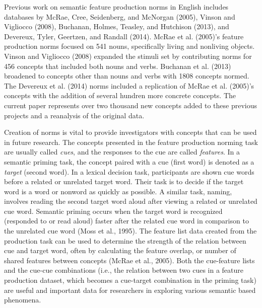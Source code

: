 \documentclass[english,,man]{apa6}
\theoremstyle{definition}
\theoremstyle{definition}
\theoremstyle{definition}
\theoremstyle{remark}
\begin{document}
Previous work on semantic feature production norms in English includes
databases by McRae, Cree, Seidenberg, and McNorgan (2005), Vinson and
Vigliocco (2008), Buchanan, Holmes, Teasley, and Hutchison (2013), and
Devereux, Tyler, Geertzen, and Randall (2014). McRae et al. (2005)'s
feature production norms focused on 541 nouns, specifically living and
nonliving objects. Vinson and Vigliocco (2008) expanded the stimuli set
by contributing norms for 456 concepts that included both nouns and
verbs. Buchanan et al. (2013) broadened to concepts other than nouns and
verbs with 1808 concepts normed. The Devereux et al. (2014) norms
included a replication of McRae et al. (2005)'s concepts with the
addition of several hundren more concrete concepts. The current paper
represents over two thousand new concepts added to these previous
projects and a reanalysis of the original data.

Creation of norms is vital to provide investigators with concepts that
can be used in future research. The concepts presented in the feature
production norming task are usually called \emph{cues}, and the
responses to the cue are called \emph{features}. In a semantic priming
task, the concept paired with a cue (first word) is denoted as a
\emph{target} (second word). In a lexical decision task, participants
are shown cue words before a related or unrelated target word. Their
task is to decide if the target word is a word or nonword as quickly as
possible. A similar task, naming, involves reading the second target
word aloud after viewing a related or unrelated cue word. Semantic
priming occurs when the target word is recognized (responded to or read
aloud) faster after the related cue word in comparison to the unrelated
cue word (Moss et al., 1995). The feature list data created from the
production task can be used to determine the strength of the relation
between cue and target word, often by calculating the feature overlap,
or number of shared features between concepts (McRae et al., 2005). Both
the cue-feature lists and the cue-cue combinations (i.e., the relation
between two cues in a feature production dataset, which becomes a
cue-target combination in the priming task) are useful and important
data for researchers in exploring various semantic based phenomena.
\end{document}
